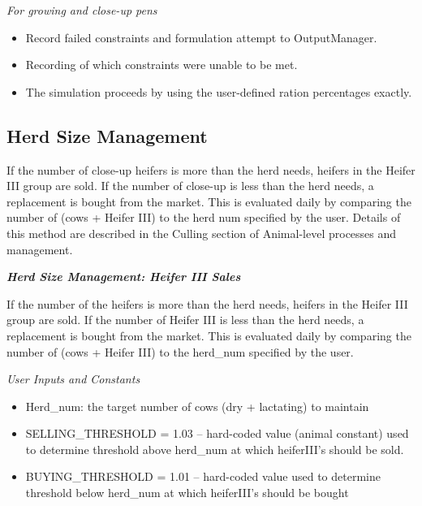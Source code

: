 \begin{refsection}
\textit{For growing and close-up pens}
\begin{itemize}
    \item Record failed constraints and formulation attempt to OutputManager.
    \item Recording of which constraints were unable to be met.
    \item The simulation proceeds by using the user-defined ration percentages exactly.


\end{itemize}

\subsection{Herd Size Management}
If the number of close-up heifers is more than the herd needs, heifers in the Heifer III group are sold. If the number of close-up is less than the herd needs, a replacement is bought from the market. This is evaluated daily by comparing the number of (cows + Heifer III) to the herd num specified by the user.
Details of this method are described in the Culling section of Animal-level processes and management. 
\vspace{0.5cm}

    \textbf{\textit{Herd Size Management: Heifer III Sales}}
    \vspace{0.2cm}
    
    If the number of the heifers is more than the herd needs, heifers in the Heifer III group are sold. If the number of Heifer III is less than the herd needs, a replacement is bought from the market. This is evaluated daily by comparing the number of (cows + Heifer III) to the herd\_num specified by the user. 
        \vspace{0.2cm}
        
         \textit{User Inputs and Constants}
         \vspace{0.1cm}
         
         \begin{itemize}
             \item Herd\_num: the target number of cows (dry + lactating) to maintain 
             \item SELLING\_THRESHOLD = 1.03 – hard-coded value (animal constant) used to determine threshold above herd\_num at which heiferIII’s should be sold. 
             \item BUYING\_THRESHOLD = 1.01 – hard-coded value used to determine threshold below herd\_num at which heiferIII’s should be bought


\end{itemize}
\end{refsection}
